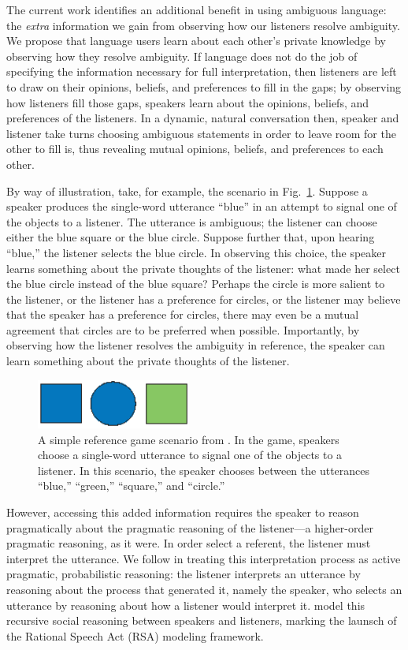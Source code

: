 \documentclass[10pt,a4paper]{article}
\begin{document}
The current work identifies an additional benefit in using ambiguous language: the \emph{extra} information we gain from observing how our listeners resolve ambiguity.
We propose that language users learn about each other's private knowledge by observing how they resolve ambiguity. If language does not do the job of specifying the information necessary for full interpretation, then listeners are left to draw on their opinions, beliefs, and preferences to fill in the gaps; by observing how listeners fill those gaps, speakers learn about the opinions, beliefs, and preferences of the listeners.
In a dynamic, natural conversation then, speaker and listener take turns choosing ambiguous statements in order to leave room for the other to fill is, thus revealing mutual opinions, beliefs, and preferences to each other. 


By way of illustration, take, for example, the scenario in Fig.~\ref{FG-ref-game}. Suppose a speaker produces the single-word utterance ``blue'' in an attempt to signal one of the objects to a listener. The utterance is ambiguous; the listener can choose either the blue square or the blue circle. Suppose further that, upon hearing ``blue,'' the listener selects the blue circle. In observing this choice, the speaker learns something about the private thoughts of the listener: what made her select the blue circle instead of the blue square? Perhaps the circle is more salient to the listener, or the listener has a preference for circles, or the listener may believe that the speaker has a preference for circles, there may even be a mutual agreement that circles are to be preferred when possible. Importantly, by observing how the listener resolves the ambiguity in reference, the speaker can learn something about the private thoughts of the listener. 

\begin{figure}
	\centering
	\includegraphics[width=2in]{images/rsascene.eps}
	\caption{A simple reference game scenario from . In the game, speakers choose a single-word utterance to signal one of the objects to a listener. In this scenario, the speaker chooses between the utterances ``blue,'' ``green,'' ``square,'' and ``circle.''}\label{FG-ref-game}
\end{figure}

However, accessing this added information requires the speaker to reason pragmatically about the pragmatic reasoning of the listener---a higher-order pragmatic reasoning, as it were. In order select a referent, the listener must interpret the utterance. We follow  in treating this interpretation process as active pragmatic, probabilistic reasoning: the listener interprets an utterance by reasoning about the process that generated it, namely the speaker, who selects an utterance by reasoning about how a listener would interpret it. \citeauthor{frankgoodman2012} model this recursive social reasoning between speakers and listeners, marking the launsch of the Rational Speech Act (RSA) modeling framework.
\end{document}
